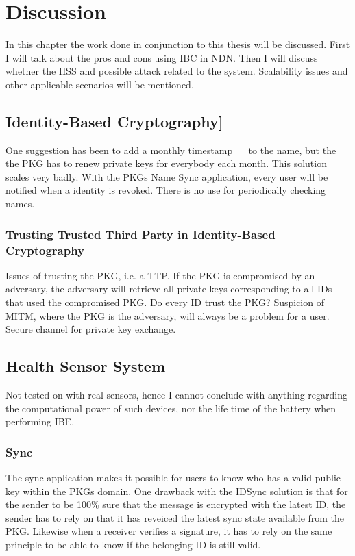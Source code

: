 \chapter{Discussion}
In this chapter the work done in conjunction to this thesis will be discussed. 
First I will talk about the pros and cons using \gls{IBC} in \gls{NDN}.
Then I will discuss whether the \gls{HSS} and possible attack related to the system. 
Scalability issues and other applicable scenarios will be mentioned.

\section{Identity-Based Cryptography]}
One suggestion has been to add a monthly timestamp~\cite{DBLP:journals/iacr/BoldyrevaGK12} ~\cite{DBLP:conf/ctrsa/LibertV09}  to the name, but the the \gls{PKG} has to renew private keys for everybody each month. 
This solution scales very badly.
With the \gls{PKG}s Name Sync application, every user will be notified when a identity is revoked.
There is no use for periodically checking names.

\subsection{Trusting Trusted Third Party in Identity-Based Cryptography}
Issues of trusting the \gls{PKG}, i.e. a \gls{TTP}. 
If the \gls{PKG} is compromised by an adversary, the adversary will retrieve all private keys corresponding to all IDs that used the compromised \gls{PKG}. 
Do every ID trust the \gls{PKG}? Suspicion of \gls{MITM}, where the \gls{PKG} is the adversary, will always be a problem for a user.
Secure channel for private key exchange. 

\section{Health Sensor System}
Not tested on with real sensors, hence I cannot conclude with anything regarding the computational power of such devices, nor the life time of the battery when performing \gls{IBE}.  

\subsection{Sync}
The sync application makes it possible for users to know who has a valid public key within the \gls{PKG}s domain.
One drawback with the IDSync solution is that for the sender to be 100\% sure that the message is encrypted with the latest \gls{ID}, the sender has to rely on that it has reveiced the latest sync state available from the \gls{PKG}.
Likewise when a receiver verifies a signature, it has to rely on the same principle to be able to know if the belonging \gls{ID} is still valid.

